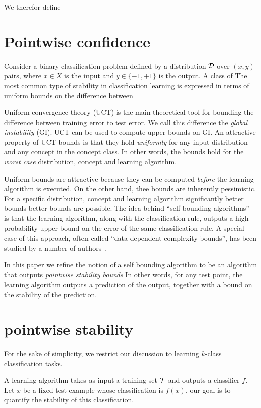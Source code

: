 \documentclass{article}
\begin{document}
We therefor define 


\iffalse

\section{Pointwise confidence}

Consider a binary classification problem defined by a distribution
${\cal D}$ over $(x,y)$ pairs, where $x \in X$ is the input and $y \in
\{-1,+1\}$ is the output. A class of 
The most common type of stability in classification learning is
expressed in terms of uniform bounds on the difference between 


Uniform convergence theory (UCT) is the main theoretical tool for
bounding the difference between training error to test error. We call
this difference the {\em global instability} (GI).  UCT can be used to
compute upper bounds on GI.  An attractive property of UCT bounds is
that they hold {\em uniformly} for any input distribution and any
concept in the concept class. In other words, the bounds hold for the
{\em worst case} distribution, concept and learning algorithm.

Uniform bounds are attractive because they can be computed {\em
  before} the learning algorithm is executed. On
the other hand, thee bounds are inherently pessimistic. For a specific
distribution, concept and learning algorithm significantly better
bounds better bounds are possible. The idea behind ``self bounding
algorithms''~\cite{freund1998self} is that the learning algorithm,
along with the classification rule, outputs a high-probability upper
bound on the error of the same classification rule. A special case of this approach,
often called ``data-dependent complexity bounds'', has been studied by
a number of authors~\cite{}.

In this paper we refine the notion of a self bounding
algorithm to be an algorithm that outputs {\em pointwise stability
bounds} In other words, for any test point, the learning algorithm
outputs a prediction of the output, together with a bound on the
stability of the prediction. 

\section{pointwise stability}

For the sake of simplicity, we restrict our discussion to learning
$k$-class classification tasks.

A learning algorithm takes as input a training set ${\cal T}$ and 
outputs a classifier $f$. Let $x$ be a fixed test example whose
classification is $f(x)$, our goal is to quantify the stability of
this classification.
\end{document}
